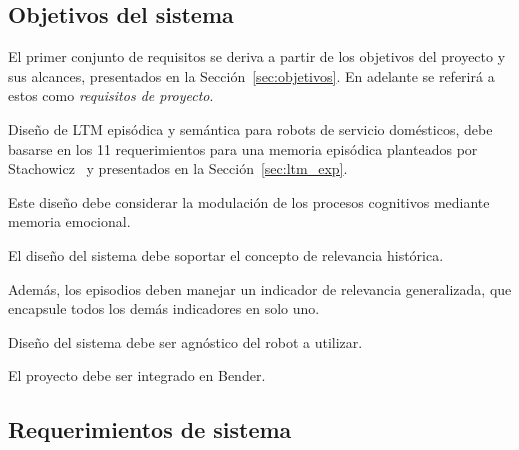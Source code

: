 \subsection{Objetivos del sistema}

El primer conjunto de requisitos se deriva a partir de los objetivos del proyecto y sus alcances, presentados en la Sección~\ref{sec:objetivos}. En adelante se referirá a estos como \textit{requisitos de proyecto}.
\begin{description}
\item {} Diseño de LTM episódica y semántica para robots de servicio domésticos, debe basarse en los 11 requerimientos para una memoria episódica planteados por Stachowicz~\cite{Stachowicz2012} y presentados en la Sección~\ref{sec:ltm_exp}.
\item {} Este diseño debe considerar la modulación de los procesos cognitivos mediante memoria emocional.
\item {} El diseño del sistema debe soportar el concepto de relevancia histórica.
\item {} Además, los episodios deben manejar un indicador de relevancia generalizada, que encapsule todos los demás indicadores en solo uno.
\item {} Diseño del sistema debe ser agnóstico del robot a utilizar.
\item {} El proyecto debe ser integrado en Bender.
\end{description}



\subsection{Requerimientos de sistema}


